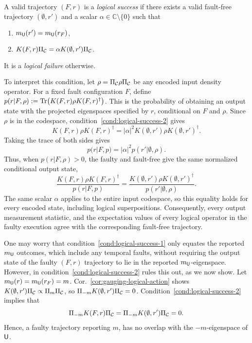 \documentclass[11pt]{article}
\begin{document}
\begin{definition}\label{def:logical-failure}
    A valid trajectory $(F,r)$ is a \emph{logical success} if there exists a valid fault-free trajectory $(\emptyset, r')$ and a scalar $\alpha\in \mathbb{C}\setminus \{0\}$
    such that
    \begin{enumerate}
        \item \label{cond:logical-success-1} $m_{\mathsf{U}}(r') = m_{\mathsf{U}} (r_F)$,
        \item \label{cond:logical-success-2} $K(F,r)\Pi_{\mathcal{C}} = \alpha K(\emptyset , r')\Pi_{\mathcal{C}}$.
    \end{enumerate}
    
    It is a \emph{logical failure} otherwise.
\end{definition}
To interpret this condition, let $\rho =\Pi_{\mathcal{C}} \rho \Pi_{\mathcal{C}}$ be any encoded input density operator.
For a fixed fault configuration $F$, define
$p(r|F,\rho):=\Tr( K(F,r) \rho K(F,r)^\dagger )$.
This is the probability of obtaining an output state with the projected eigenspaces specified by $r$, conditional on $F$ and $\rho$.
Since $\rho$ is in the codespace, condition~\ref{cond:logical-success-2} gives
\[
K(F,r) \rho K(F,r)^\dagger = |\alpha|^2 K(\emptyset,r') \rho K(\emptyset,r')^\dagger.
\] 
Taking the trace of both sides gives
\[
p(r|F,p) = |\alpha|^2 p (r'|\emptyset,\rho).
\]
Thus, when $p(r|F,\rho)>0$, the faulty and fault-free give the same normalized conditional output state,
\[
    \frac{K(F,r)\rho K(F,r)^\dagger}{p(r|F,p)} = \frac{K(\emptyset,r')\rho K(\emptyset, r')^\dagger}{p(r'|\emptyset,\rho)}.
\]
The same scalar $\alpha$ applies to the entire input codespace, so this equality holds for every encoded state, including logical superpositions. Consequently, every output measurement statistic, and the expectation values of every logical operator in the faulty execution agree with the corresponding fault-free trajectory.

One may worry that condition~\ref{cond:logical-success-1} only equates the reported $m_{\mathsf{U}}$ outcomes, which include any temporal faults, without requiring the output state of the faulty $(F,r)$ trajectory to lie in the reported $m_{\mathsf{U}}$-eigenspace. However, in condition~\ref{cond:logical-success-2} rules this out, as we now show.
Let $m_{\mathsf{U}}(r) = m_{\mathsf{U}}(r_F)=m$. Cor.~\ref{cor:gauging-logical-action} shows $K(\emptyset,r')\Pi_{\mathcal{C}} \propto \Pi_{m}\Pi_{\mathcal{C}}$, so
$\Pi_{-m} K(\emptyset, r')\Pi_{\mathcal{C}} = 0$.
Condition~\ref{cond:logical-success-2} implies that 
\[
\Pi_{-m} K(F, r)\Pi_{\mathcal{C}}  = \Pi_{-m} K(\emptyset, r')\Pi_{\mathcal{C}} =0.
\]
Hence, a faulty trajectory reporting $m$, has no overlap with the $-m$-eigenspace of $\mathsf{U}$.
\end{document}
